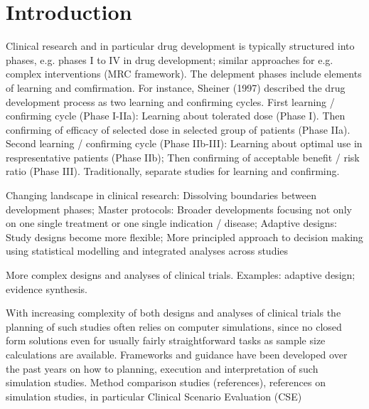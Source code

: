 \documentclass[bimj,fleqn]{w-art}
\theoremstyle{plain}
\theoremstyle{definition}
\begin{document}
\maketitle                   %







\section{Introduction}

Clinical research and in particular drug development is typically structured into phases, e.g. phases I to IV in drug development; similar approaches for e.g. complex interventions (MRC framework). 
The delepment phases include elements of learning and comfirmation. 
For instance, Sheiner (1997) described the drug development process as two learning and confirming cycles. 
First learning / confirming cycle (Phase I-IIa): Learning about tolerated dose (Phase I). 
Then confirming of efficacy of selected dose in selected group of patients (Phase IIa). 
Second learning / confirming cycle (Phase IIb-III): Learning about optimal use in respresentative patients (Phase IIb); Then confirming of acceptable benefit / risk ratio (Phase III). 
Traditionally, separate studies for learning and confirming.  

Changing landscape in clinical research: Dissolving boundaries between development phases; Master protocols: Broader developments focusing not only on one single treatment or one single indication / disease; Adaptive designs: Study designs become more flexible; More principled approach to decision making using statistical modelling and integrated analyses across studies

More complex designs and analyses of clinical trials. 
Examples: adaptive design; evidence synthesis.

With increasing complexity of both designs and analyses of  clinical trials the planning of such studies often relies on computer simulations, since no closed form solutions even for usually fairly straightforward tasks as sample size calculations are available. 
Frameworks and guidance have been developed over the past years on how to planning, execution and interpretation of such simulation studies. 
Method comparison studies (references), references on simulation studies, in particular Clinical Scenario Evaluation (CSE) \\
\end{document}
